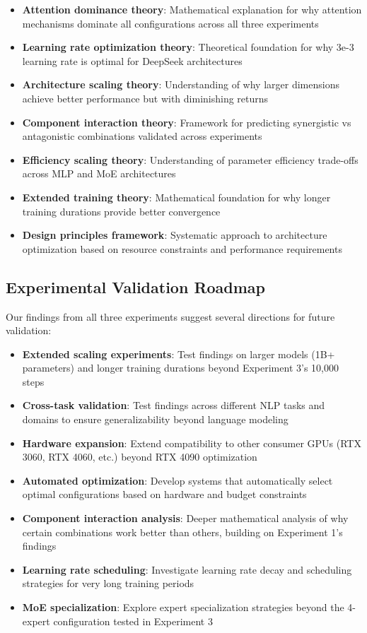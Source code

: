 \documentclass[11pt,a4paper]{article}
\begin{document}
\begin{itemize}
    \item \textbf{Attention dominance theory}: Mathematical explanation for why attention mechanisms dominate all configurations across all three experiments
    \item \textbf{Learning rate optimization theory}: Theoretical foundation for why 3e-3 learning rate is optimal for DeepSeek architectures
    \item \textbf{Architecture scaling theory}: Understanding of why larger dimensions achieve better performance but with diminishing returns
    \item \textbf{Component interaction theory}: Framework for predicting synergistic vs antagonistic combinations validated across experiments
    \item \textbf{Efficiency scaling theory}: Understanding of parameter efficiency trade-offs across MLP and MoE architectures
    \item \textbf{Extended training theory}: Mathematical foundation for why longer training durations provide better convergence
    \item \textbf{Design principles framework}: Systematic approach to architecture optimization based on resource constraints and performance requirements
\end{itemize}

\subsection{Experimental Validation Roadmap}

Our findings from all three experiments suggest several directions for future validation:

\begin{itemize}
    \item \textbf{Extended scaling experiments}: Test findings on larger models (1B+ parameters) and longer training durations beyond Experiment 3's 10,000 steps
    \item \textbf{Cross-task validation}: Test findings across different NLP tasks and domains to ensure generalizability beyond language modeling
    \item \textbf{Hardware expansion}: Extend compatibility to other consumer GPUs (RTX 3060, RTX 4060, etc.) beyond RTX 4090 optimization
    \item \textbf{Automated optimization}: Develop systems that automatically select optimal configurations based on hardware and budget constraints
    \item \textbf{Component interaction analysis}: Deeper mathematical analysis of why certain combinations work better than others, building on Experiment 1's findings
    \item \textbf{Learning rate scheduling}: Investigate learning rate decay and scheduling strategies for very long training periods
    \item \textbf{MoE specialization}: Explore expert specialization strategies beyond the 4-expert configuration tested in Experiment 3
\end{itemize}
\end{document}

